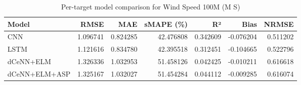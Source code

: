 \begin{table}
\caption{Per-target model comparison for Wind Speed 100M (M S)}
\begin{tabular}{lrrrrrr}
\toprule
Model & RMSE & MAE & sMAPE (\%) & R² & Bias & NRMSE \\
\midrule
CNN & 1.096741 & 0.824285 & 42.476808 & 0.342609 & -0.076204 & 0.511202 \\
LSTM & 1.121616 & 0.834780 & 42.395518 & 0.312451 & -0.104665 & 0.522796 \\
dCeNN+ELM & 1.326336 & 1.032953 & 51.458126 & 0.042425 & -0.010211 & 0.616618 \\
dCeNN+ELM+ASP & 1.325167 & 1.032027 & 51.454284 & 0.044112 & -0.009285 & 0.616074 \\
\bottomrule
\end{tabular}
\end{table}
